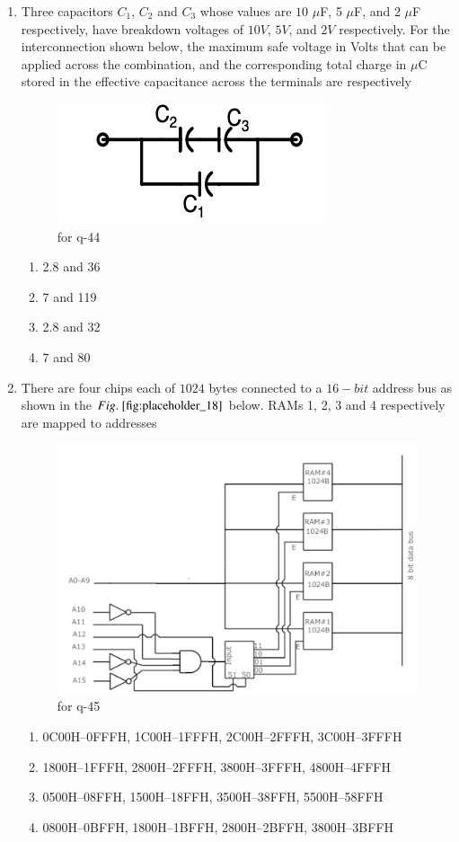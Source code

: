 \documentclass[journal,12pt,onecolumn]{IEEEtran}
\theoremstyle{remark}
\begin{document}
\begin{enumerate}
\item Three capacitors $C_1$, $C_2$ and $C_3$ whose values are $10$ $\mu$F, 5 $\mu$F, and 2 $\mu$F respectively, have breakdown voltages of $10 V$, $5 V$, and $2 V$ respectively. For the interconnection shown below, the maximum safe voltage in Volts that can be applied across the combination, and the corresponding total charge in $\mu$C stored in the effective capacitance across the terminals are respectively
\begin{figure}[H]
    \centering
    \includegraphics[width=0.5\columnwidth]{figs/fig_17.png}
    \caption{for q-44}
    \label{fig:placeholder_17}
\end{figure}
\begin{multicols}{2}
\begin{enumerate}
\item 2.8 and 36
\item 7 and 119
\item 2.8 and 32
\item 7 and 80
\end{enumerate}
\end{multicols}
\hfill {}

\item There are four chips each of $1024 $ bytes connected to a $16-bit$ address bus as shown in the $\figref{fig:placeholder_18}$ below. RAMs 1, 2, 3 and 4 respectively are mapped to addresses
\begin{figure}[H]
    \centering
    \includegraphics[width=0.5\columnwidth]{figs/fig_18.png}
    \caption{for q-45}
    \label{fig:placeholder_18}
\end{figure}

\begin{enumerate}
\item 0C00H–0FFFH, 1C00H–1FFFH, 2C00H–2FFFH, 3C00H–3FFFH
\item 1800H–1FFFH, 2800H–2FFFH, 3800H–3FFFH, 4800H–4FFFH
\item 0500H–08FFH, 1500H–18FFH, 3500H–38FFH, 5500H–58FFH
\item 0800H–0BFFH, 1800H–1BFFH, 2800H–2BFFH, 3800H–3BFFH
\end{enumerate}
\hfill {}


\end{enumerate}
\end{document}
